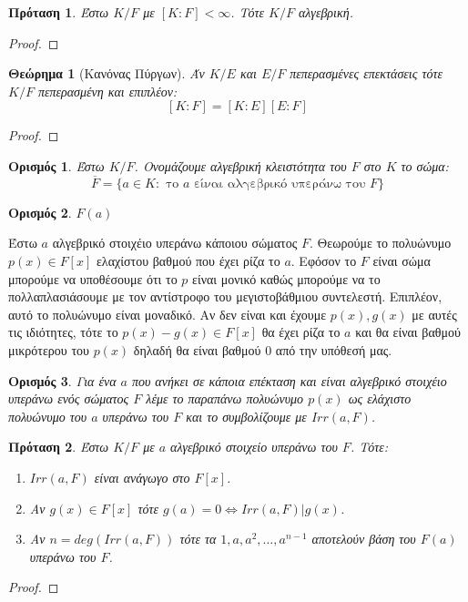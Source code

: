 \documentclass[oneside,a4paper]{article}
\newtheorem{theorem}{Θεώρημα}
\newtheorem*{defn}{Ορισμός}
\newtheorem{prop}{Πρόταση}
\begin{document}
\begin{prop}
	Έστω $K/F$ με $[K:F]<\infty$. Τότε $K/F$ αλγεβρική.
\end{prop}

\begin{proof}
\end{proof}

\begin{theorem}[Κανόνας Πύργων]
	Άν $K/E$ και $E/F$ πεπερασμένες επεκτάσεις τότε $K/F$ πεπερασμένη και επιπλέον:
	$$[K:F]=[K:E][E:F]$$
\end{theorem}
\begin{proof}
\end{proof}

\begin{defn} Έστω $K/F$. Ονομάζουμε αλγεβρική κλειστότητα του $F$ στο $K$ το σώμα:
	$$\overline F = \{a \in K: \text{ το } a \text{ είναι αλγεβρικό υπεράνω του } F\}$$ 
\end{defn} %

\begin{defn} $F(a)$
\end{defn}

Έστω $a$ αλγεβρικό στοιχέιο υπεράνω κάποιου σώματος $F$. Θεωρούμε το πολυώνυμο $p(x) \in F[x]$ ελαχίστου βαθμού που έχει ρίζα το $a$. Εφόσον το $F$ είναι σώμα μπορούμε να υποθέσουμε ότι το $p$ είναι μονικό καθώς μπορούμε να το πολλαπλασιάσουμε με τον αντίστροφο του μεγιστοβάθμιου συντελεστή. Επιπλέον, αυτό το πολυώνυμο είναι μοναδικό. Αν δεν είναι και έχουμε $p(x), g(x)$ με αυτές τις ιδιότητες, τότε το $p(x)-g(x) \in F[x]$ θα έχει ρίζα το $a$ και θα είναι βαθμού μικρότερου του $p(x)$ δηλαδή θα είναι βαθμού 0 από την υπόθεσή μας.
\begin{defn} Για ένα $a$ που ανήκει σε κάποια επέκταση και είναι αλγεβρικό στοιχέιο υπεράνω ενός σώματος $F$ λέμε το παραπάνω πολυώνυμο $p(x)$ ως ελάχιστο πολυώνυμο του $a$ υπεράνω του $F$ και το συμβολίζουμε με $Irr(a,F)$. 
\end{defn}

\begin{prop}
	Έστω $K/F$ με $a$ αλγεβρικό στοιχείο υπεράνω του $F$. Τότε:
	\begin{enumerate}
		\item $Irr(a,F)$ είναι ανάγωγο στο $F[x]$.
		\item Αν $g(x) \in F[x]$ τότε $g(a) = 0 \iff Irr(a,F) | g(x)$.
		\item Αν $n = deg(Irr(a,F))$ τότε τα $1,a,a^2,\ldots,a^{n-1}$ αποτελούν βάση του $F(a)$ υπεράνω του $F$.
	\end{enumerate}
\end{prop}
\begin{proof}
\end{proof}
\end{document}
